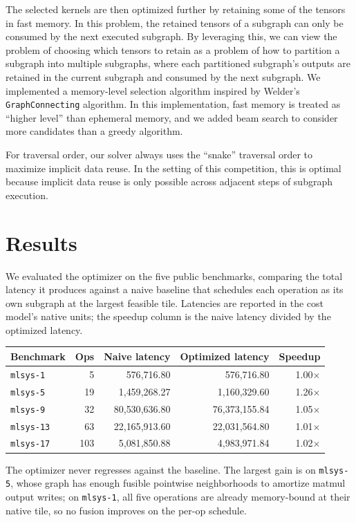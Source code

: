 \documentclass[10pt,letterpaper]{article}
\begin{document}
The selected kernels are then optimized further by retaining some of the tensors in fast memory.
In this problem, the retained tensors of a subgraph can only be consumed by the next executed subgraph. By leveraging this, we can view the problem of choosing which tensors to retain as a problem of how to partition a subgraph into multiple subgraphs, where each partitioned subgraph's outputs are retained in the current subgraph and consumed by the next subgraph. We implemented a memory-level selection algorithm inspired by Welder's \texttt{GraphConnecting} algorithm\cite{welder2023}. In this implementation, fast memory is treated as ``higher level'' than ephemeral memory, and we added beam search to consider more candidates than a greedy algorithm.

For traversal order, our solver always uses the ``snake'' traversal order to maximize implicit data reuse. In the setting of this competition, this is optimal because implicit data reuse is only possible across adjacent steps of subgraph execution.

\section{Results}

We evaluated the optimizer on the five public benchmarks, comparing the total latency it produces against a naive baseline that schedules each operation as its own subgraph at the largest feasible tile. Latencies are reported in the cost model's native units; the speedup column is the naive latency divided by the optimized latency.

\begin{table}[h]
\centering
\begin{tabular}{lrrrr}
\toprule
Benchmark & Ops & Naive latency & Optimized latency & Speedup \\
\midrule
\texttt{mlsys-1}  & 5   & 576{,}716.80      & 576{,}716.80      & 1.00$\times$ \\
\texttt{mlsys-5}  & 19  & 1{,}459{,}268.27  & 1{,}160{,}329.60  & 1.26$\times$ \\
\texttt{mlsys-9}  & 32  & 80{,}530{,}636.80 & 76{,}373{,}155.84 & 1.05$\times$ \\
\texttt{mlsys-13} & 63  & 22{,}165{,}913.60 & 22{,}031{,}564.80 & 1.01$\times$ \\
\texttt{mlsys-17} & 103 & 5{,}081{,}850.88  & 4{,}983{,}971.84  & 1.02$\times$ \\
\bottomrule
\end{tabular}
\end{table}

The optimizer never regresses against the baseline. The largest gain is on \texttt{mlsys-5}, whose graph has enough fusible pointwise neighborhoods to amortize matmul output writes; on \texttt{mlsys-1}, all five operations are already memory-bound at their native tile, so no fusion improves on the per-op schedule.



\end{document}
